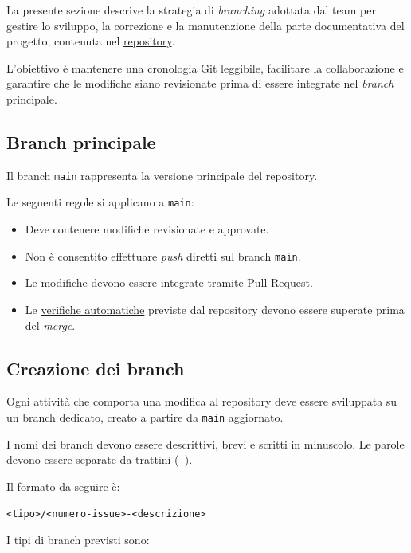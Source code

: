 \documentclass[11pt, a4paper]{article}
\begin{document}
La presente sezione descrive la strategia di \textit{branching} adottata dal team per gestire lo sviluppo, la correzione e la manutenzione della parte documentativa del progetto, contenuta nel \href{https://github.com/On-By-One-Team/On-By-One.github.io}{repository}.

L'obiettivo è mantenere una cronologia Git leggibile, facilitare la collaborazione e garantire che le modifiche siano revisionate prima di essere integrate nel \textit{branch} principale.

\subsection{Branch principale}

Il branch \texttt{main} rappresenta la versione principale del repository.

Le seguenti regole si applicano a \texttt{main}:
\begin{itemize}
    \item Deve contenere modifiche revisionate e approvate.
    \item Non è consentito effettuare \textit{push} diretti sul branch \texttt{main}.
    \item Le modifiche devono essere integrate tramite Pull Request.
    \item Le \href{https://github.com/On-By-One-Team/On-By-One.github.io/tree/main/.github/workflows}{verifiche automatiche} previste dal repository devono essere superate prima del \textit{merge}.
\end{itemize}

\subsection{Creazione dei branch}
\label{subsec:creazione-dei-branch}

Ogni attività che comporta una modifica al repository deve essere sviluppata su un branch dedicato, creato a partire da \texttt{main} aggiornato.

I nomi dei branch devono essere descrittivi, brevi e scritti in minuscolo. Le parole devono essere separate da trattini (\texttt{-}).

Il formato da seguire è:

\noindent \texttt{<tipo>/<numero-issue>-<descrizione>}

I tipi di branch previsti sono:
\end{document}
